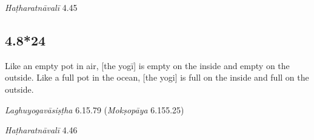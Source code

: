 \begin{ekdosis}
\begin{testimonia}[hp04_008_23]
\emph{Haṭharatnāvalī} 4.45
\begin{versinnote}
\end{versinnote}
\end{testimonia}


\subsection*{4.8*24}
\begin{translation}[hp04_008_24]
Like an empty pot in air, [the yogī] is empty on the inside and empty on the outside. Like a full pot in the ocean, [the yogi] is full on the inside and full on the outside.%
\end{translation}

\begin{sources}[hp04_008_24]
\emph{Laghuyogavāsiṣṭha} 6.15.79 (\emph{Mokṣopāya} 6.155.25)
\begin{versinnote}
\end{versinnote}
\end{sources}

\begin{testimonia}[hp04_008_24]
\emph{Haṭharatnāvalī} 4.46
\begin{versinnote}
\end{versinnote}



\end{testimonia}
\end{ekdosis}
